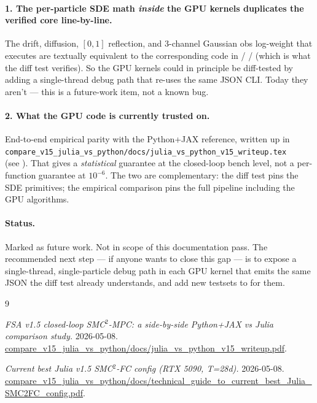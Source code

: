 \documentclass[11pt,a4paper]{article}
\begin{document}
\paragraph{1. The per-particle SDE math \emph{inside} the GPU kernels
duplicates the verified core line-by-line.} The drift, diffusion, $[0,1]$
reflection, and 3-channel Gaussian obs log-weight that
 executes are textually equivalent to
the corresponding code in  /  /
 (which is what the diff test verifies). So the
GPU kernels could in principle be diff-tested by adding a
single-thread debug path that re-uses the same JSON CLI. Today they
aren't --- this is a future-work item, not a known bug.

\paragraph{2. What the GPU code is currently trusted on.}
End-to-end empirical parity with the Python+JAX reference, written up
in
\\\texttt{compare\_v15\_julia\_vs\_python/docs/julia\_vs\_python\_v15\_writeup.tex}\\
(see \cite{writeup}). That gives a \emph{statistical} guarantee at the
closed-loop bench level, not a per-function guarantee at $10^{-6}$. The
two are complementary: the diff test pins the SDE primitives; the
empirical comparison pins the full pipeline including the GPU
algorithms.

\paragraph{Status.} Marked as future work. Not in scope of this
documentation pass. The recommended next step --- if anyone wants to
close this gap --- is to expose a single-thread, single-particle debug
path in each GPU kernel that emits the same JSON the diff test already
understands, and add new testsets to
 for them.


\begin{thebibliography}{9}

  \emph{FSA v1.5 closed-loop SMC$^2$-MPC: a side-by-side Python+JAX vs
  Julia comparison study.} 2026-05-08.
  \\\url{compare_v15_julia_vs_python/docs/julia_vs_python_v15_writeup.pdf}.

  \emph{Current best Julia v1.5 SMC$^2$-FC config (RTX 5090, T=28d).}
  2026-05-08.
  \\\url{compare_v15_julia_vs_python/docs/technical_guide_to_current_best_Julia_SMC2FC_config.pdf}.

\end{thebibliography}
\end{document}
